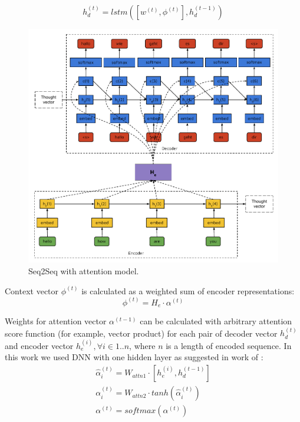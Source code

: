 \begin{equation}
h_d^{(t)} = lstm([w^{(t)}, \phi^{(t)}], h_d^{(t-1)})
\label{attn:hd}
\end{equation}

\begin{figure}
\centering
\includegraphics[width=5in]{Figures/seq2seq.pdf}
\decoRule
\caption[Seq2Seq model]{Seq2Seq with attention model.}
\label{fig:seq2seq}
\end{figure}

Context vector $\phi^{(t)}$ is calculated as a weighted sum of encoder representations:
\begin{equation}
	\phi^{(t)} = H_e\cdot\alpha^{(t)}
	\label{attn:phi}
\end{equation}

Weights for attention vector $\alpha^{(t-1)}$ can be calculated with arbitrary attention score function (for example, vector product) for each pair of decoder vector $h_d^{(t)}$ and encoder vector $h_e^{(i)}, \forall i \in 1..n$, where $n$ is a length of encoded sequence. In this work we used DNN with one hidden layer as suggested in work of \cite{Bahdanau2014}:
\begin{equation}
\begin{gathered}
\hat{\alpha}_i^{(t)} = W_{attn1} \cdot [h_e^{(i)}, h_d^{(t-1)}] \\
\alpha_i^{(t)} = W_{attn2} \cdot tanh(\hat{\alpha}_{i}^{(t)}) \\
\alpha^{(t)} = softmax(\alpha^{(t)})
\end{gathered}
\label{attn:alpha}
\end{equation}


